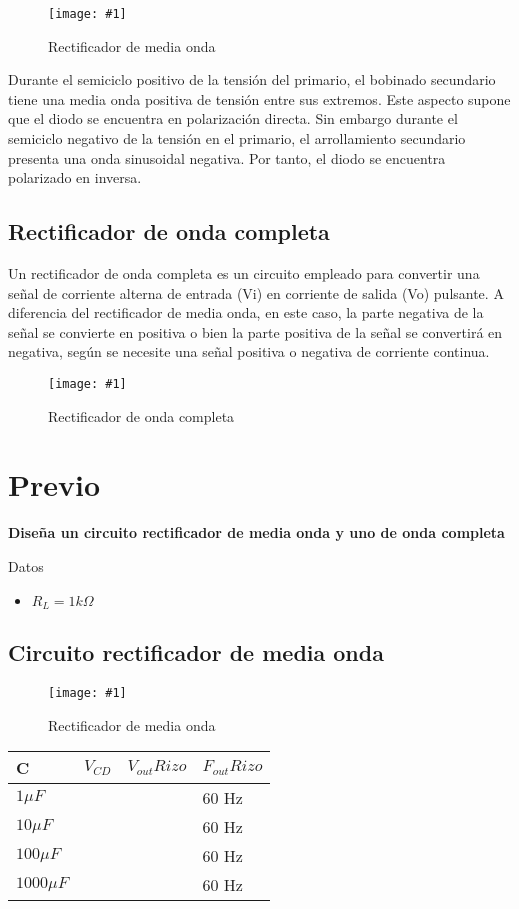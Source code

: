 \documentclass{mylib/reporteConCalif}
\newcommand{\insertImage}[3]{
	\begin{figure}[H]
		\centering
		\texttt{[image: \#1]}
		\caption{#2}
	\end{figure}
}
\begin{document}
\insertImage{img/labdisp_pract4/hwr}{Rectificador de media onda}{8}
	
Durante el semiciclo positivo de la tensión del primario, el bobinado secundario tiene una media onda positiva de tensión entre sus extremos. Este aspecto supone que el diodo se encuentra en polarización directa. Sin embargo durante el semiciclo negativo de la tensión en el primario, el arrollamiento secundario presenta una onda sinusoidal negativa. Por tanto, el diodo se encuentra polarizado en inversa.

\subsection{Rectificador de onda completa}

Un rectificador de onda completa es un circuito empleado para convertir una señal de corriente alterna de entrada (Vi) en corriente de salida (Vo) pulsante. A diferencia del rectificador de media onda, en este caso, la parte negativa de la señal se convierte en positiva o bien la parte positiva de la señal se convertirá en negativa, según se necesite una señal positiva o negativa de corriente continua.

\insertImage{img/labdisp_pract4/fwr}{Rectificador de onda completa}{8}


\newpage
\section{Previo}

\textbf{Diseña un circuito rectificador de media onda y uno de onda completa}

Datos
\begin{itemize}
	\item $R_L = 1k\Omega$
\end{itemize}

\subsection{Circuito rectificador de media onda}

	\insertImage{img/labdisp_pract4/hwrc}{Rectificador de media onda}{12}
	\begin{center}
	\begin{tabu} to 0.8\textwidth { | X[c] | X[c] | X[c] | X[c] | }
		 \hline
		 C & $V_{CD}$ & $V_{out}Rizo$ & $F_{out}Rizo$ \\
		 \hline
		 $1 \mu F$ &  &  & 60 Hz \\
		 \hline
		 $10 \mu F$ &  &  & 60 Hz \\
		 \hline
		 $100 \mu F$ &  &  & 60 Hz \\
		 \hline
		 $1000 \mu F$ &  &  & 60 Hz \\
		 \hline
	\end{tabu}
	\end{center}
\end{document}
